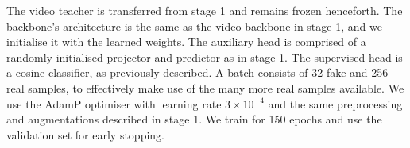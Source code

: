 \documentclass[10pt,twocolumn,letterpaper]{article}
\begin{document}
\begin{description}[wide,itemindent=\labelsep]
\item[Implementation details.] The video teacher is transferred from stage 1 and remains frozen henceforth. The backbone's architecture is the same as the video backbone in stage 1, and we initialise it with the learned weights. The auxiliary head is comprised of a randomly initialised projector and predictor as in stage 1. The supervised head is a cosine classifier, as previously described. A batch consists of 32 fake and 256 real samples, to effectively make use of the many more real samples available. We use the AdamP optimiser with learning rate $3\times 10^{-4}$ and the same preprocessing and augmentations described in stage 1. We train for 150 epochs and use the validation set for early stopping.

\end{description}
\end{document}

